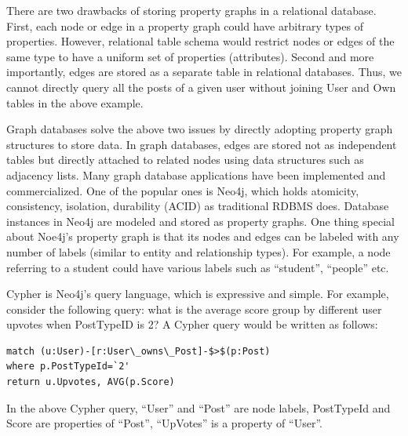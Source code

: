 There are two drawbacks of storing property graphs in a relational database. First, each node or edge in a property graph could have arbitrary types of properties. However, relational table schema would restrict nodes or edges of the same type to have a uniform set of properties (attributes). Second and more importantly, edges are stored as a separate table in relational databases. Thus, we cannot directly query all the posts of a given user without joining User and Own tables in the above example.

Graph databases solve the above two issues by directly adopting property graph structures to store data. In graph databases, edges are stored not as independent tables but directly attached to related nodes using data structures such as adjacency lists. Many graph database applications have been implemented and commercialized. One of the popular ones is Neo4j, which holds atomicity, consistency, isolation, durability (ACID) as traditional RDBMS does. Database instances in Neo4j are modeled and stored as  property graphs. %
One thing special about Noe4j’s property graph is that its nodes and edges can be labeled with any number of labels (similar to entity and relationship types). For example, a node referring to a student could have various labels such as “student”, “people” etc.

Cypher is Neo4j’s query language, which is expressive and simple. For example, consider the following query: what is the average score group by different user upvotes when PostTypeID is 2? A Cypher query would be written as follows:

\begin{verbatim}
match (u:User)-[r:User\_owns\_Post]-$>$(p:Post) 
where p.PostTypeId=`2' 
return u.Upvotes, AVG(p.Score)
\end{verbatim}

In the above Cypher query, ``User'' and ``Post'' are node labels, PostTypeId and Score are properties of ``Post'', ``UpVotes'' is a property of ``User''.


%


